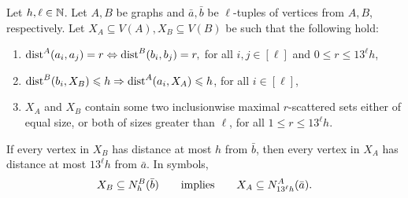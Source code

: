 \begin{lemma}\label{lem:scatter}
    Let \(h,\ell \in \mathbb N\).
    Let \(A,B\) be graphs and \(\bar a, \bar b\) be \(\ell\)-tuples of vertices from \(A,B\), respectively.
    Let \(X_A \subseteq V(A),X_B \subseteq V(B)\) be such that the following hold:
    \begin{enumerate}
        \item  \(\mathrm{dist}^A(a_i,a_j) =r \Leftrightarrow \mathrm{dist}^B(b_i,b_j)= r,\) for all \(i,j \in [\ell]\) and \(0 \le r \le 13^\ell h\),

        \item  \(\mathrm{dist}^B(b_i,X_B) \leqslant h \Rightarrow \mathrm{dist}^A(a_i,X_A) \leqslant h\), for all \(i\in[\ell]\),
        \item  $X_A$ and $X_B$ contain 
         some two inclusionwise maximal \(r\)-scattered sets either of equal size, or both of sizes greater than $\ell$, for all \(1 \le r \le 13^\ell h\).
    \end{enumerate}
    If every vertex in \(X_B\) has distance at most \(h\) from \(\bar b\),
    then every vertex in \(X_A\) has distance at most \(13^\ell h\) from \(\bar a\). In symbols,
    $$X_B\subseteq N_h^B(\bar b)\qquad\text{implies}\qquad X_A\subseteq N^A_{13^\ell h}(\bar a).$$
\end{lemma}
